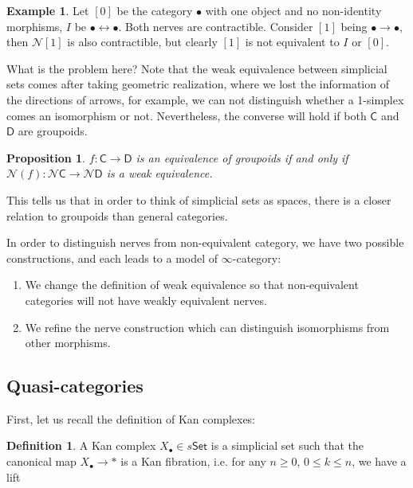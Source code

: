 \documentclass[11pt]{amsart}
\numberwithin{equation}{section}
\newtheorem{prop}[thm]{Proposition}
\theoremstyle{definition}
\newtheorem{example}[thm]{Example}
\newtheorem{defn}[thm]{Definition}
\theoremstyle{remark}
\numberwithin{equation}{section}
\newcommand{\CC}{{\mathsf C}}
\newcommand{\CD}{{\mathsf D}}
\newcommand{\CN}{{\mathcal N}}
\newcommand{\set}{\mathsf{Set}}
\begin{document}
\begin{example}
	Let $[0]$ be the category $\bullet$ with one object and no non-identity morphisms, $I$ be $\bullet \leftrightarrow \bullet$. Both nerves are contractible. Consider $[1]$ being $\bullet \to \bullet$, then $\CN [1]$ is also contractible, but clearly $[1]$ is not equivalent to $I$ or $[0]$.
\end{example}

What is the problem here? Note that the weak equivalence between simplicial sets comes after taking geometric realization, where we lost the information of the directions of arrows, for example, we can not distinguish whether a 1-simplex comes an isomorphism or not. Nevertheless, the converse will hold if both $\CC$ and $\CD$ are groupoids.
\begin{prop}
	$f:\CC \to \CD$ is an equivalence of groupoids if and only if $\CN(f): \CN \CC \to \CN \CD$ is a weak equivalence.
\end{prop}

This tells us that in order to think of simplicial sets as spaces, there is a closer relation to groupoids than general categories.

In order to distinguish nerves from non-equivalent category, we have two possible constructions, and each leads to a model of $\infty$-category:
\begin{enumerate}
	\item We change the definition of weak equivalence so that non-equivalent categories will not have weakly equivalent nerves.
	\item We refine the nerve construction which can distinguish isomorphisms from other morphisms.
\end{enumerate}
\subsection{Quasi-categories}

First, let us recall the definition of Kan complexes:
\begin{defn}
	A Kan complex $X_{\bullet} \in s\set$ is a simplicial set such that the canonical map $X_{\bullet} \to \ast$ is a Kan fibration, i.e. for any $n\ge 0$, $0\le k \le n$, we have a lift
	\begin{center}
	\end{center}
\end{defn}
\end{document}
